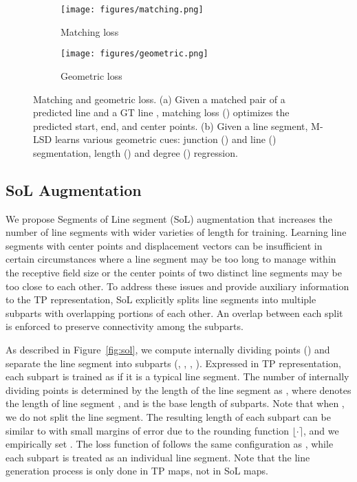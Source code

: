 \documentclass[letterpaper]{article} \usepackage{aaai22}  \usepackage{times}  \usepackage{helvet}  \usepackage{courier}  \usepackage[hyphens]{url}  \usepackage{graphicx} \urlstyle{rm} \def\UrlFont{\rm}  \usepackage{natbib}  \usepackage{caption} \DeclareCaptionStyle{ruled}{labelfont=normalfont,labelsep=colon,strut=off} \frenchspacing  \setlength{\pdfpagewidth}{8.5in}  \setlength{\pdfpageheight}{11in}  \usepackage{algorithm}
\newcommand{\round}[1]{\ensuremath{\lfloor#1\rceil}}
\begin{document}
\begin{figure}[t!]
    \centering
    \begin{subfigure}[b]{0.48\columnwidth}
        \centering\texttt{[image: figures/matching.png]}
         \caption{Matching loss}
         \label{fig:matching}
     \end{subfigure}
     \begin{subfigure}[b]{0.48\columnwidth}
        \centering\texttt{[image: figures/geometric.png]}
         \caption{Geometric loss}
         \label{fig:geometric}
     \end{subfigure}
\caption{Matching and geometric loss. (a) Given a matched pair of a predicted line  and a GT line , matching loss () optimizes the predicted start, end, and center points. (b) Given a line segment, M-LSD learns various geometric cues: junction () and line () segmentation, length () and degree () regression.}
\label{fig:losses}
\end{figure}

\subsection{SoL Augmentation}
We propose Segments of Line segment (SoL) augmentation that increases the number of line segments with wider varieties of length for training.
Learning line segments with center points and displacement vectors can be insufficient in certain circumstances where a line segment may be too long to manage within the receptive field size or the center points of two distinct line segments may be too close to each other.
To address these issues and provide auxiliary information to the TP representation, SoL explicitly splits line segments into multiple subparts with overlapping portions of each other.
An overlap between each split is enforced to preserve connectivity among the subparts.

As described in Figure~\ref{fig:sol}, we compute  internally dividing points () and separate the line segment  into  subparts (, , , ).
Expressed in TP representation, each subpart is trained as if it is a typical line segment.
The number of internally dividing points  is determined by the length of the line segment as , where  denotes the length of line segment , and  is the base length of subparts.
Note that when , we do not split the line segment.
The resulting length of each subpart can be similar to  with small margins of error due to the rounding function \round{\cdot}, and we empirically set .
The loss function of  follows the same configuration as , while each subpart is treated as an individual line segment.
Note that the line generation process is only done in TP maps, not in SoL maps.
\end{document}
